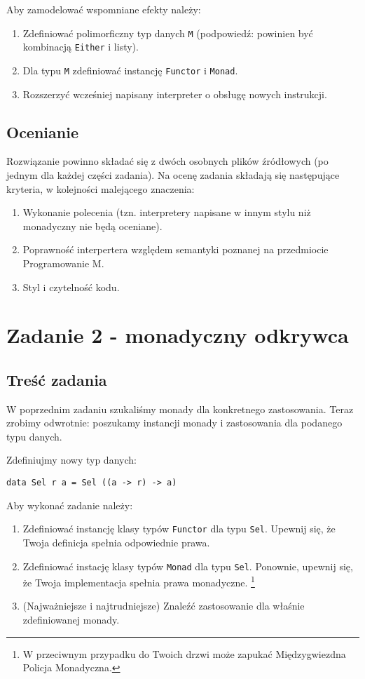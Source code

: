 \documentclass{article}[12pt]
\begin{document}
Aby zamodelować wspomniane efekty należy:
\begin{enumerate}
    \item Zdefiniować polimorficzny typ danych \texttt{M} (podpowiedź: powinien
        być kombinacją \texttt{Either} i listy).
    \item Dla typu \texttt{M} zdefiniować instancję \texttt{Functor} i \texttt{Monad}.
    \item Rozszerzyć wcześniej napisany interpreter o obsługę nowych instrukcji.
\end{enumerate}

\subsection{Ocenianie}
Rozwiązanie powinno składać się z dwóch osobnych plików źródłowych (po jednym
dla każdej części zadania). Na ocenę zadania składają się następujące kryteria,
w kolejności malejącego znaczenia:
\begin{enumerate}
    \item Wykonanie polecenia (tzn. interpretery napisane w innym stylu niż
        monadyczny nie będą oceniane).
    \item Poprawność interpertera względem semantyki poznanej na przedmiocie
        Programowanie M.
    \item Styl i czytelność kodu.
\end{enumerate}

\section{Zadanie 2 - monadyczny odkrywca}
\subsection{Treść zadania}
W poprzednim zadaniu szukaliśmy monady dla konkretnego zastosowania. Teraz
zrobimy odwrotnie: poszukamy instancji monady i zastosowania dla podanego
typu danych.

Zdefiniujmy nowy typ danych:
\begin{verbatim}
data Sel r a = Sel ((a -> r) -> a)
\end{verbatim}

Aby wykonać zadanie należy:
\begin{enumerate}
    \item Zdefiniować instancję klasy typów \texttt{Functor} dla typu \texttt{Sel}.
        Upewnij się, że Twoja definicja spełnia odpowiednie prawa.
    \item Zdefiniować instację klasy typów \texttt{Monad} dla typu \texttt{Sel}.
        Ponownie, upewnij się, że Twoja implementacja spełnia prawa monadyczne.
        \footnote{W przeciwnym przypadku do Twoich drzwi może zapukać Międzygwiezdna
        Policja Monadyczna.}
    \item (Najważniejsze i najtrudniejsze) Znaleźć zastosowanie dla właśnie zdefiniowanej
        monady.
\end{enumerate}
\end{document}

